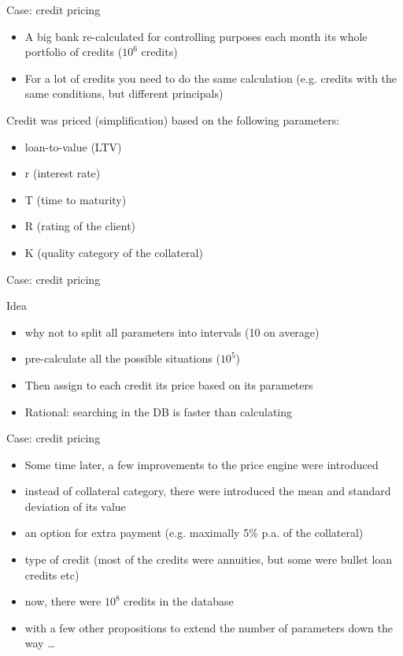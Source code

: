 \documentclass[presentation]{beamer}
\begin{document}
\begin{frame}[label=sec-3-7]{Case: credit pricing}
\begin{itemize}
\item A big bank re-calculated for controlling purposes each month its whole portfolio of credits ($10^6$ credits)
\item For a lot of credits you need to do the same calculation (e.g. credits with the same conditions, but different principals)
\end{itemize}
\begin{block}{Credit was priced (simplification) based on the following parameters:}
\begin{itemize}
\item loan-to-value (LTV)
\item r (interest rate)
\item T (time to maturity)
\item R (rating of the client)
\item K (quality category of the collateral)
\end{itemize}
\end{block}
\end{frame}
\begin{frame}[label=sec-3-8]{Case: credit pricing}
\begin{block}{Idea}
\begin{itemize}
\item why not to split all parameters into intervals (10 on average)
\item pre-calculate all the possible situations ($10^5$)
\item Then assign to each credit its price based on its parameters
\item Rational: searching in the DB is faster than calculating
\end{itemize}
\end{block}
\end{frame}
\begin{frame}[label=sec-3-9]{Case: credit pricing}
\begin{itemize}
\item Some time later, a few improvements to the price engine were introduced
\item instead of collateral category, there were introduced the mean and standard deviation of its value
\item an option for extra payment (e.g. maximally 5\% p.a. of the collateral)
\item type of credit (most of the credits were annuities, but some were bullet loan credits etc)
\item now, there were $10^8$ credits in the database
\item with a few other propositions to extend the number of parameters down the way \ldots{}
\end{itemize}
\end{frame}
\end{document}
